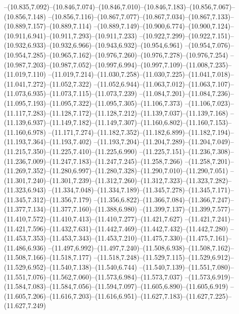   --(10.835,7.092)--(10.846,7.074)--(10.846,7.010)--(10.846,7.183)--(10.856,7.067)--(10.856,7.148)%
  --(10.856,7.116)--(10.867,7.077)--(10.867,7.034)--(10.867,7.133)--(10.889,7.157)--(10.889,7.114)%
  --(10.889,7.149)--(10.900,6.774)--(10.900,7.124)--(10.911,6.941)--(10.911,7.293)--(10.911,7.233)%
  --(10.922,7.299)--(10.922,7.151)--(10.932,6.933)--(10.932,6.966)--(10.943,6.932)--(10.954,6.961)%
  --(10.954,7.076)--(10.954,7.285)--(10.965,7.162)--(10.976,7.260)--(10.976,7.278)--(10.976,7.254)%
  --(10.987,7.203)--(10.987,7.052)--(10.997,6.994)--(10.997,7.109)--(11.008,7.235)--(11.019,7.110)%
  --(11.019,7.214)--(11.030,7.258)--(11.030,7.225)--(11.041,7.018)--(11.041,7.272)--(11.052,7.322)%
  --(11.052,6.944)--(11.063,7.012)--(11.063,7.107)--(11.073,6.935)--(11.073,7.115)--(11.073,7.239)%
  --(11.084,7.201)--(11.084,7.236)--(11.095,7.193)--(11.095,7.322)--(11.095,7.305)--(11.106,7.373)%
  --(11.106,7.023)--(11.117,7.283)--(11.128,7.172)--(11.128,7.212)--(11.139,7.037)--(11.139,7.168)%
  --(11.139,6.937)--(11.149,7.182)--(11.149,7.307)--(11.160,6.802)--(11.160,7.153)--(11.160,6.978)%
  --(11.171,7.274)--(11.182,7.352)--(11.182,6.899)--(11.182,7.194)--(11.193,7.364)--(11.193,7.402)%
  --(11.193,7.204)--(11.204,7.289)--(11.204,7.049)--(11.215,7.350)--(11.225,7.410)--(11.225,6.990)%
  --(11.225,7.151)--(11.236,7.308)--(11.236,7.009)--(11.247,7.183)--(11.247,7.245)--(11.258,7.266)%
  --(11.258,7.201)--(11.269,7.352)--(11.280,6.997)--(11.280,7.328)--(11.290,7.010)--(11.290,7.051)%
  --(11.301,7.240)--(11.301,7.239)--(11.312,7.260)--(11.312,7.323)--(11.323,7.282)--(11.323,6.943)%
  --(11.334,7.048)--(11.334,7.189)--(11.345,7.278)--(11.345,7.171)--(11.345,7.312)--(11.356,7.179)%
  --(11.356,6.822)--(11.366,7.084)--(11.366,7.247)--(11.377,7.134)--(11.377,7.160)--(11.388,6.980)%
  --(11.399,7.137)--(11.399,7.577)--(11.410,7.572)--(11.410,7.413)--(11.410,7.277)--(11.421,7.627)%
  --(11.421,7.241)--(11.421,7.596)--(11.432,7.631)--(11.442,7.469)--(11.442,7.432)--(11.442,7.280)%
  --(11.453,7.353)--(11.453,7.343)--(11.453,7.210)--(11.475,7.330)--(11.475,7.161)--(11.486,6.936)%
  --(11.497,6.992)--(11.497,7.240)--(11.508,6.938)--(11.508,7.162)--(11.508,7.166)--(11.518,7.177)%
  --(11.518,7.248)--(11.529,7.115)--(11.529,6.912)--(11.529,6.952)--(11.540,7.138)--(11.540,6.744)%
  --(11.540,7.139)--(11.551,7.080)--(11.551,7.076)--(11.562,7.060)--(11.573,6.984)--(11.573,7.037)%
  --(11.573,6.919)--(11.584,7.083)--(11.584,7.056)--(11.594,7.097)--(11.605,6.890)--(11.605,6.919)%
  --(11.605,7.206)--(11.616,7.203)--(11.616,6.951)--(11.627,7.183)--(11.627,7.225)--(11.627,7.249)%
